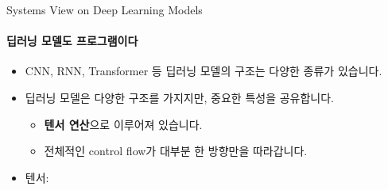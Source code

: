 \begin{frame}{Systems View on Deep Learning Models}
\framesubtitle{딥러닝 모델도 프로그램이다}

\begin{itemize}
  \item CNN, RNN, Transformer 등 딥러닝 모델의 구조는 다양한 종류가 있습니다.
  \item 딥러닝 모델은 다양한 구조를 가지지만, 중요한 특성을 공유합니다.
  \begin{itemize}
    \item \textbf{텐서 연산}으로 이루어져 있습니다.
    \item 전체적인 control flow가 대부분 한 방향만을 따라갑니다.
  \end{itemize}
  \pause
  \item 텐서: 
\end{itemize}
\end{frame}